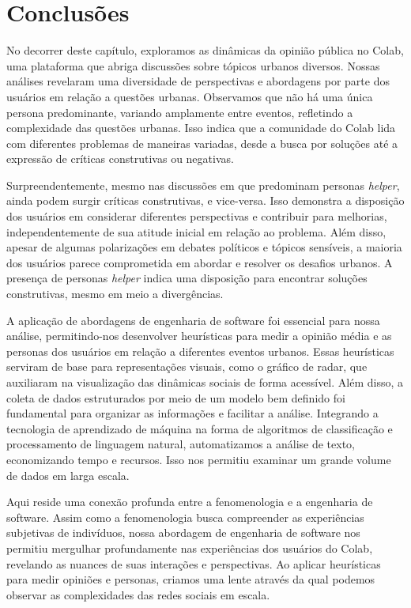 \section{Conclusões}

No decorrer deste capítulo, exploramos as dinâmicas da opinião pública no Colab, uma plataforma que abriga discussões sobre tópicos urbanos diversos. Nossas análises revelaram uma diversidade de perspectivas e abordagens por parte dos usuários em relação a questões urbanas. Observamos que não há uma única persona predominante, variando amplamente entre eventos, refletindo a complexidade das questões urbanas. Isso indica que a comunidade do Colab lida com diferentes problemas de maneiras variadas, desde a busca por soluções até a expressão de críticas construtivas ou negativas.

Surpreendentemente, mesmo nas discussões em que predominam personas \textit{helper}, ainda podem surgir críticas construtivas, e vice-versa. Isso demonstra a disposição dos usuários em considerar diferentes perspectivas e contribuir para melhorias, independentemente de sua atitude inicial em relação ao problema. Além disso, apesar de algumas polarizações em debates políticos e tópicos sensíveis, a maioria dos usuários parece comprometida em abordar e resolver os desafios urbanos. A presença de personas \textit{helper} indica uma disposição para encontrar soluções construtivas, mesmo em meio a divergências.

A aplicação de abordagens de engenharia de software foi essencial para nossa análise, permitindo-nos desenvolver heurísticas para medir a opinião média e as personas dos usuários em relação a diferentes eventos urbanos. Essas heurísticas serviram de base para representações visuais, como o gráfico de radar, que auxiliaram na visualização das dinâmicas sociais de forma acessível. Além disso, a coleta de dados estruturados por meio de um modelo bem definido foi fundamental para organizar as informações e facilitar a análise. Integrando a tecnologia de aprendizado de máquina na forma de algoritmos de classificação e processamento de linguagem natural, automatizamos a análise de texto, economizando tempo e recursos. Isso nos permitiu examinar um grande volume de dados em larga escala.

Aqui reside uma conexão profunda entre a fenomenologia e a engenharia de software. Assim como a fenomenologia busca compreender as experiências subjetivas de indivíduos, nossa abordagem de engenharia de software nos permitiu mergulhar profundamente nas experiências dos usuários do Colab, revelando as nuances de suas interações e perspectivas. Ao aplicar heurísticas para medir opiniões e personas, criamos uma lente através da qual podemos observar as complexidades das redes sociais em escala.

